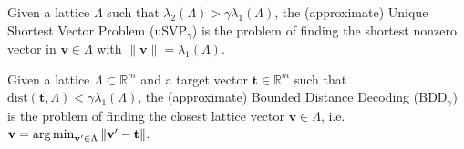 \begin{definition} \label{def:usvp}
  Given a lattice $\Lambda$ such that $\lambda_2(\Lambda) > \gamma \lambda_1(\Lambda)$, the (approximate) Unique Shortest Vector Problem (uSVP$_\gamma$) is the problem of finding the shortest nonzero vector in $\mathbf{v} \in \Lambda$ with $\|\mathbf{v}\| = \lambda_1(\Lambda)$.
\end{definition}

\begin{definition} \label{def:bdd}
  Given a lattice $\Lambda \subset \mathbb{R}^m$ and a target vector $\mathbf{t}\in\mathbb{R}^m$ such that $\text{dist}(\mathbf{t}, \Lambda) < \gamma \lambda_1(\Lambda)$, the (approximate)  Bounded Distance Decoding (BDD$_\gamma$) is the problem of finding the closest lattice vector $\mathbf{v} \in \Lambda$, i.e. $\mathbf{v} = \operatorname*{arg\,min}_{\mathbf{v}' \in \Lambda} \|\mathbf{v}' - \mathbf{t}\|$.
\end{definition}



